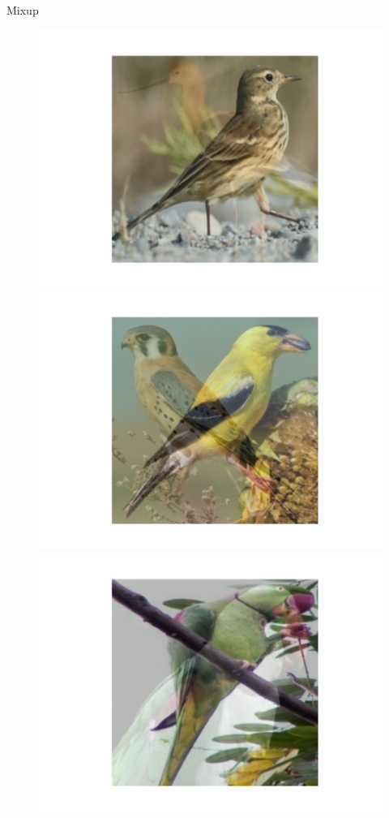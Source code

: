 \documentclass[a4paper,10pt]{beamer}
\begin{document}
\begin{frame}{Mixup}

\begin{figure}[!htb]
	\includegraphics[trim=3cm 2cm 3cm 3cm, width=\linewidth]{mixup1.pdf}
	\endminipage\hfill
	\includegraphics[trim=3cm 2cm 3cm 3cm, width=\linewidth]{mixup2.pdf}
	\endminipage\hfill
	\includegraphics[trim=3cm 2cm 3cm 3cm, width=\linewidth]{mixup3.pdf}

\end{figure}
\end{frame}
\end{document}
